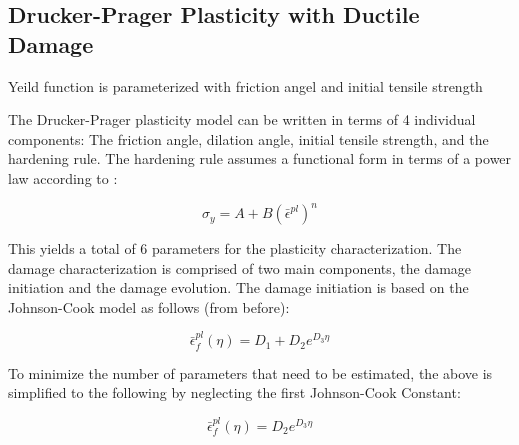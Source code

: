 \subsection{Drucker-Prager Plasticity with Ductile Damage}
Yeild function is parameterized with friction angel and initial tensile strength

The Drucker-Prager plasticity model can be written in terms of 4 individual
components: The friction angle, dilation angle, initial tensile strength,
and the hardening rule. The hardening rule assumes a functional form
in terms of a power law according to \cite{prantl_identification_2013}:

\begin{equation}
\sigma_{y}=A+B\left(\bar{\epsilon}^{pl}\right)^{n}\label{eqn:dparam5}
\end{equation}

This yields a total of 6 parameters for the plasticity characterization.
The damage characterization is comprised of two main components, the
damage initiation and the damage evolution. The damage initiation
is based on the Johnson-Cook model as follows (from before):

\begin{equation}
\bar{\epsilon}_{f}^{pl}\left(\eta\right)=D_{1}+D_{2}e^{D_{3}\eta}\label{eqn:dparam6}
\end{equation}


To minimize the number of parameters that need to be estimated, the
above is simplified to the following by neglecting the first Johnson-Cook
Constant:

\begin{equation}
\bar{\epsilon}_{f}^{pl}\left(\eta\right)=D_{2}e^{D_{3}\eta}\label{eqn:dparam6-1}
\end{equation}

